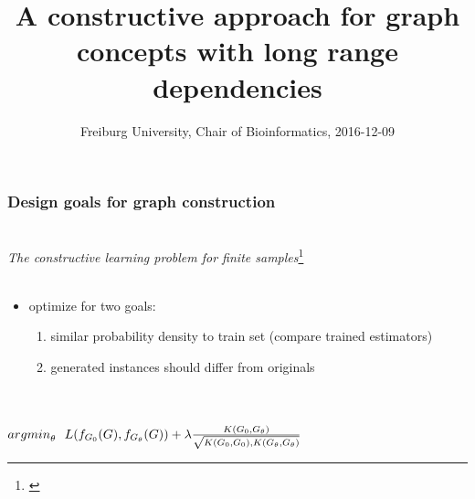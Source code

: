 \documentclass{beamer}
\title 
{A constructive approach for graph concepts
with long range dependencies}
\author %
{\underline{Stefan Mautner} \and Fabrizio Costa
    \small{ 
        \texttt{
            \href{mailto:mautner@informatik.uni-freiburg.de}
            {mautner@informatik.uni-freiburg.de}}
        \texttt{
            \href{mailto:costa@informatik.uni-freiburg.de}
            {costa@informatik.uni-freiburg.de}}}
}
\date 
{Freiburg University, Chair of Bioinformatics, 2016-12-09}
\begin{document}
\frame{\titlepage}



\begin{frame}
\frametitle{Design goals for graph construction}

    ~\\
    \emph{The constructive learning problem for finite samples}\footnote{\cite{costa16}}
    ~\\
    ~\\
    \begin{itemize}
        \item optimize for two goals:
            \begin{enumerate}
        \item similar probability density to train set (compare trained estimators)
        \item generated instances should  differ from originals
            \end{enumerate}
    \end{itemize}
    ~\\
    ~\\
    \Large{${argmin}_{\theta}~~L(f_{G_0}(G),f_{G_{\theta}}(G))+
    \lambda{{K(G_0,G_{\theta})}\over{\sqrt{K(G_0,G_0),K(G_{\theta},G_{\theta})}}} $}
\end{frame}
\end{document}

